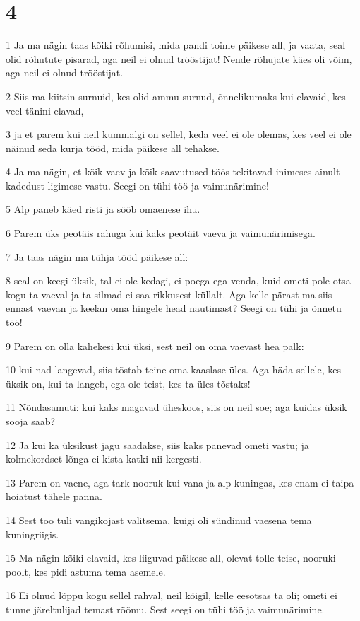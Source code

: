 \chapter{4}

\par 1 Ja ma nägin taas kõiki rõhumisi, mida pandi toime päikese all, ja vaata, seal olid rõhutute pisarad, aga neil ei olnud trööstijat! Nende rõhujate käes oli võim, aga neil ei olnud trööstijat.
\par 2 Siis ma kiitsin surnuid, kes olid ammu surnud, õnnelikumaks kui elavaid, kes veel tänini elavad,
\par 3 ja et parem kui neil kummalgi on sellel, keda veel ei ole olemas, kes veel ei ole näinud seda kurja tööd, mida päikese all tehakse.
\par 4 Ja ma nägin, et kõik vaev ja kõik saavutused töös tekitavad inimeses ainult kadedust ligimese vastu. Seegi on tühi töö ja vaimunärimine!
\par 5 Alp paneb käed risti ja sööb omaenese ihu.
\par 6 Parem üks peotäis rahuga kui kaks peotäit vaeva ja vaimunärimisega.
\par 7 Ja taas nägin ma tühja tööd päikese all:
\par 8 seal on keegi üksik, tal ei ole kedagi, ei poega ega venda, kuid ometi pole otsa kogu ta vaeval ja ta silmad ei saa rikkusest küllalt. Aga kelle pärast ma siis ennast vaevan ja keelan oma hingele head nautimast? Seegi on tühi ja õnnetu töö!
\par 9 Parem on olla kahekesi kui üksi, sest neil on oma vaevast hea palk:
\par 10 kui nad langevad, siis tõstab teine oma kaaslase üles. Aga häda sellele, kes üksik on, kui ta langeb, ega ole teist, kes ta üles tõstaks!
\par 11 Nõndasamuti: kui kaks magavad üheskoos, siis on neil soe; aga kuidas üksik sooja saab?
\par 12 Ja kui ka üksikust jagu saadakse, siis kaks panevad ometi vastu; ja kolmekordset lõnga ei kista katki nii kergesti.
\par 13 Parem on vaene, aga tark nooruk kui vana ja alp kuningas, kes enam ei taipa hoiatust tähele panna.
\par 14 Sest too tuli vangikojast valitsema, kuigi oli sündinud vaesena tema kuningriigis.
\par 15 Ma nägin kõiki elavaid, kes liiguvad päikese all, olevat tolle teise, nooruki poolt, kes pidi astuma tema asemele.
\par 16 Ei olnud lõppu kogu sellel rahval, neil kõigil, kelle eesotsas ta oli; ometi ei tunne järeltulijad temast rõõmu. Sest seegi on tühi töö ja vaimunärimine.

